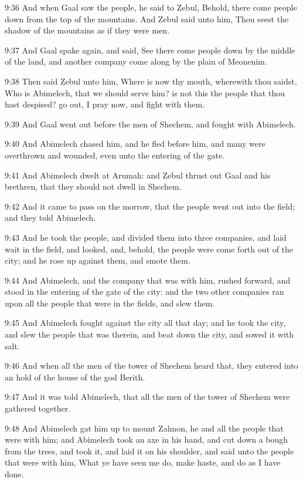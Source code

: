 9:36 And when Gaal saw the people, he said to Zebul, Behold, there come people down from the top of the mountains. And Zebul said unto him, Thou seest the shadow of the mountains as if they were men.

9:37 And Gaal spake again, and said, See there come people down by the middle of the land, and another company come along by the plain of Meonenim.

9:38 Then said Zebul unto him, Where is now thy mouth, wherewith thou saidst, Who is Abimelech, that we should serve him? is not this the people that thou hast despised? go out, I pray now, and fight with them.

9:39 And Gaal went out before the men of Shechem, and fought with Abimelech.

9:40 And Abimelech chased him, and he fled before him, and many were overthrown and wounded, even unto the entering of the gate.

9:41 And Abimelech dwelt at Arumah: and Zebul thrust out Gaal and his brethren, that they should not dwell in Shechem.

9:42 And it came to pass on the morrow, that the people went out into the field; and they told Abimelech.

9:43 And he took the people, and divided them into three companies, and laid wait in the field, and looked, and, behold, the people were come forth out of the city; and he rose up against them, and smote them.

9:44 And Abimelech, and the company that was with him, rushed forward, and stood in the entering of the gate of the city: and the two other companies ran upon all the people that were in the fields, and slew them.

9:45 And Abimelech fought against the city all that day; and he took the city, and slew the people that was therein, and beat down the city, and sowed it with salt.

9:46 And when all the men of the tower of Shechem heard that, they entered into an hold of the house of the god Berith.

9:47 And it was told Abimelech, that all the men of the tower of Shechem were gathered together.

9:48 And Abimelech gat him up to mount Zalmon, he and all the people that were with him; and Abimelech took an axe in his hand, and cut down a bough from the trees, and took it, and laid it on his shoulder, and said unto the people that were with him, What ye have seen me do, make haste, and do as I have done.

